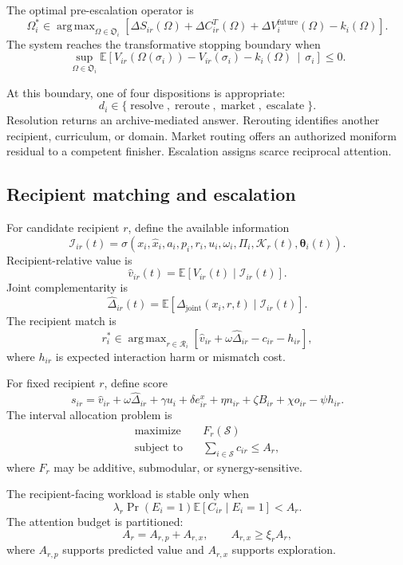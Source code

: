 \documentclass[11pt]{article}
\theoremstyle{definition}
\DeclareMathOperator{\argmax}{arg\,max}
\DeclareMathOperator{\Prob}{Pr}
\newcommand{\E}{\mathbb{E}}
\newcommand{\K}{\mathcal{K}}
\newcommand{\thetaState}{\boldsymbol{\theta}}
\newcommand{\given}{\,\middle|\,}
\begin{document}
The optimal pre-escalation operator is
\[
\Omega_i^{*}
\in
\argmax_{\Omega\in\mathfrak{O}_i}
\left[
\Delta S_{ir}(\Omega)
+
\Delta C_{ir}^{T}(\Omega)
+
\Delta V_i^{\mathrm{future}}(\Omega)
-
k_i(\Omega)
\right].
\]
The system reaches the transformative stopping boundary when
\[
\sup_{\Omega\in\mathfrak{O}_i}
\E\!\left[
V_{ir}(\Omega(\sigma_i))
-
V_{ir}(\sigma_i)
-
k_i(\Omega)
\given
\sigma_i
\right]
\leq0.
\]

At this boundary, one of four dispositions is appropriate:
\[
d_i
\in
\{
\operatorname{resolve},
\operatorname{reroute},
\operatorname{market},
\operatorname{escalate}
\}.
\]
Resolution returns an archive-mediated answer. Rerouting identifies another recipient, curriculum, or domain. Market routing offers an authorized moniform residual to a competent finisher. Escalation assigns scarce reciprocal attention.

\subsection{Recipient matching and escalation}

For candidate recipient \(r\), define the available information
\[
\mathscr{I}_{ir}(t)
=
\sigma\!\left(
x_i,
\widehat x_i,
a_i,
p_i,
r_i,
u_i,
\omega_i,
\Pi_i,
\K_r(t),
\thetaState_i(t)
\right).
\]
Recipient-relative value is
\[
\widehat v_{ir}(t)
=
\E[
V_{ir}(t)
\mid
\mathscr{I}_{ir}(t)
].
\]
Joint complementarity is
\[
\widehat{\Delta}_{ir}(t)
=
\E[
\Delta_{\mathrm{joint}}(x_i,r,t)
\mid
\mathscr{I}_{ir}(t)
].
\]
The recipient match is
\[
r_i^{*}
\in
\argmax_{r\in\mathcal{R}_i}
\left[
\widehat v_{ir}
+
\omega\widehat{\Delta}_{ir}
-
c_{ir}
-
h_{ir}
\right],
\]
where \(h_{ir}\) is expected interaction harm or mismatch cost.

For fixed recipient \(r\), define score
\[
s_{ir}
=
\widehat v_{ir}
+
\omega\widehat{\Delta}_{ir}
+
\gamma u_i
+
\delta e_{ir}^{x}
+
\eta n_{ir}
+
\zeta B_{ir}
+
\chi o_{ir}
-
\psi h_{ir}.
\]
The interval allocation problem is
\[
\begin{aligned}
\text{maximize}\quad&
F_r(\mathcal{S})
\\
\text{subject to}\quad&
\sum_{i\in\mathcal{S}}c_{ir}
\leq A_r,
\end{aligned}
\]
where \(F_r\) may be additive, submodular, or synergy-sensitive.

The recipient-facing workload is stable only when
\[
\lambda_r
\Prob(E_i=1)
\E[C_{ir}\mid E_i=1]
<
A_r.
\]
The attention budget is partitioned:
\[
A_r=A_{r,p}+A_{r,x},
\qquad
A_{r,x}\geq\xi_rA_r,
\]
where \(A_{r,p}\) supports predicted value and \(A_{r,x}\) supports exploration.
\end{document}
